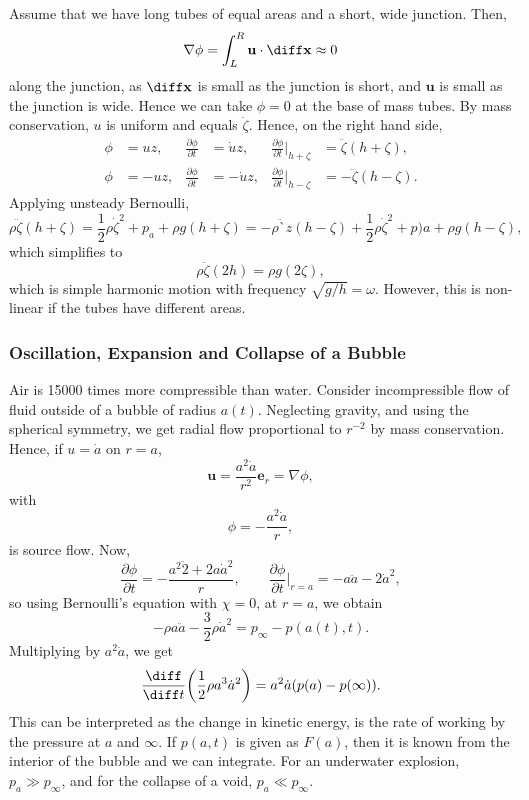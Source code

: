 \documentclass[12pt]{article}
\begin{document}
Assume that we have long tubes of equal areas and a short, wide junction. Then,
\[
\nabla \phi = \int_{L}^{R} \mathbf{u} \cdot \diff \mathbf{x} \approx 0
\]
along the junction, as $\diff \mathbf{x}$ is small as the junction is short, and $\mathbf{u}$ is small as the junction is wide. Hence we can take $\phi = 0$ at the base of mass tubes. By mass conservation, $u$ is uniform and equals $\dot \zeta$. Hence, on the right hand side,
\begin{align*}
	\phi &= uz, & \frac{\partial \phi}{\partial t} &= \dot u z, & \frac{\partial \phi}{\partial t} \biggr|_{h + \zeta} &= \ddot \zeta(h + \zeta), \\
	\phi &= -uz, & \frac{\partial \phi}{\partial t} &= - \dot uz, &\frac{\partial \phi}{\partial t} \biggr|_{h - \zeta} &= - \ddot \zeta(h - \zeta).
\end{align*}
Applying unsteady Bernoulli,
\[
\rho \ddot \zeta (h + \zeta) = \frac{1}{2} \rho \dot \zeta^2 + p_a + \rho g(h + \zeta) = - \rho \ddot `z (h - \zeta) + \frac{1}{2} \rho \dot \zeta^2 + p)a + \rho g(h - \zeta),
\]
which simplifies to
\[
\rho \ddot \zeta(2h) = \rho g(2 \zeta),
\]
which is simple harmonic motion with frequency $\sqrt{g/h} = \omega$. However, this is non-linear if the tubes have different areas.

\subsubsection{Oscillation, Expansion and Collapse of a Bubble}
\label{subsub:bubbles}

Air is \num{15000} times more compressible than water. Consider incompressible flow of fluid outside of a bubble of radius $a(t)$. Neglecting gravity, and using the spherical symmetry, we get radial flow proportional to $r^{-2}$ by mass conservation. Hence, if $u = \dot a$ on $r = a$,
\[
\mathbf{u} = \frac{a^2 \dot a}{r^2} \mathbf{e}_r = \nabla \phi,
\]
with
\[
\phi = - \frac{a^2 \dot a}{r},
\]
is source flow. Now,
\[
\frac{\partial \phi}{\partial t} = - \frac{a^2 \ddot 2 + 2 a \dot a ^2}{r}, \qquad \frac{\partial \phi}{\partial t}\biggr|_{r = a} = -a \ddot a - 2 \dot a^2,
\]
so using Bernoulli's equation with $\chi = 0$, at $r = a$, we obtain
\[
- \rho a \ddot a - \frac{3}{2} \rho \dot a^2 = p_{\infty} - p(a(t), t).
\]
Multiplying by $a^2 \dot a$, we get
\[
\frac{\diff}{\diff t} \biggl( \frac{1}{2} \rho a^3 \dot a^2 \biggr) = a^2 \dot a (p(a) - p(\infty)).
\]
This can be interpreted as the change in kinetic energy, is the rate of working by the pressure at $a$ and $\infty$. If $p(a, t)$ is given as $F(a)$, then it is known from the interior of the bubble and we can integrate. For an underwater explosion, $p_a \gg p_{\infty}$, and for the collapse of a void, $p_a \ll p_{\infty}$.
\end{document}
